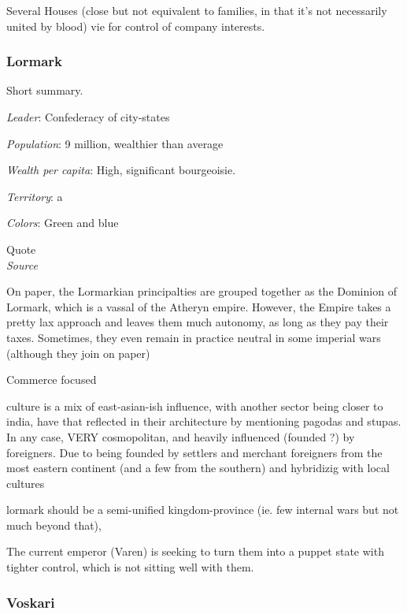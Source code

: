 Several Houses (close but not equivalent to families, in that it's not necessarily united by blood) vie for control of company interests.



\subsubsection{Lormark}

Short summary.

\textit{Leader}: Confederacy of city-states

\textit{Population}: 9 million, wealthier than average

\textit{Wealth per capita}: High, significant bourgeoisie.

\textit{Territory}: a
    
\textit{Colors}: Green and blue


\begin{rpg-quotebox}
Quote \\ \textendash \textit{Source}
\end{rpg-quotebox}

On paper, the Lormarkian principalties are grouped together as the Dominion of Lormark, which is a vassal of the Atheryn empire. However, the Empire takes a pretty lax approach and leaves them much autonomy, as long as they pay their taxes. Sometimes, they even remain in practice neutral in some imperial wars (although they join on paper)

Commerce focused

culture is a mix of east-asian-ish influence, with another sector being closer to india, have that reflected in their architecture by mentioning pagodas and stupas. In any case, VERY cosmopolitan, and heavily influenced (founded ?) by foreigners. Due to being founded by settlers and merchant foreigners from the most eastern continent (and a few from the southern) and hybridizig with local cultures

lormark should be a semi-unified kingdom-province (ie. few internal wars but not much beyond that), 

The current emperor (Varen) is seeking to turn them into a puppet state with tighter control, which is not sitting well with them.

	

\subsubsection{Voskari}


